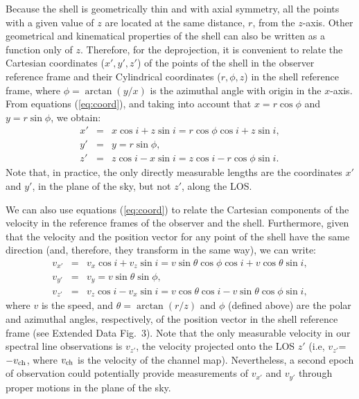 \documentclass[12pt]{mythesis}
\begin{document}
Because the shell is geometrically thin and with axial symmetry, all the points with a given value of $z$ are located at the same distance, $r$, from the $z$-axis. Other geometrical and kinematical properties of the shell can also be written as a function only of $z$. Therefore, for the deprojection, it is convenient to relate the Cartesian coordinates ($x',y',z'$) of the points of the shell in the observer reference frame and their Cylindrical coordinates ($r,\phi,z$) in the shell reference frame, where $\phi = \arctan\left(y/x\right)$ is the azimuthal angle with origin in the $x$-axis. From equations (\ref{eq:coord}), and taking into account that $x=r\cos\phi$ and $y=r\sin\phi$, 
we obtain:
\begin{eqnarray}
\label{eq:xpcoord}
x' &=& x\cos{i} + z\sin{i} = r\cos{\phi}\cos{i} + z\sin{i},\\
\label{eq:ypcoord}
y' &=& y = r\sin{\phi},\\
z' &=& z\cos i - x\sin i= z\cos i - r\cos\phi\sin i.
\end{eqnarray}
Note that, in practice, the only directly measurable lengths are the coordinates $x'$ and $y'$, in the plane of the sky, but not $z'$, along the LOS.

We can also use equations (\ref{eq:coord}) to relate the Cartesian components of the velocity in the reference frames of the observer and the shell. Furthermore, given that the velocity and the position vector for any point of the shell have the same direction (and, therefore, they transform in the same way), we can write:
\begin{eqnarray}
	v_{x'} &=& v_x\cos i + v_z\sin i = v\sin\theta\cos\phi\cos i + v\cos\theta\sin i,\\
	v_{y'} &=& v_{y} = v\sin\theta\sin\phi,\\
\label{eq:vzpcoord}
	v_{z'} &=& v_z\cos i - v_x\sin i = v\cos\theta\cos i - v\sin\theta\cos\phi\sin i, 
\end{eqnarray}
where $v$ is the speed, and $\theta=\arctan\left(r/z\right)$ and $\phi$ (defined above) are the polar and azimuthal angles, respectively, of the position vector in the shell reference frame (see Extended Data Fig.~3). Note that the only measurable velocity in our spectral line observations is $v_{z'}$, the velocity projected onto the LOS $z'$ (i.e, $v_{z'}$=$-v_{\rm ch}$, where $v_{\rm ch}$ is the velocity of the channel map). Nevertheless, a second epoch of observation could potentially provide measurements of $v_{x'}$ and $v_{y'}$ through proper motions in the plane of the sky.
\end{document}
